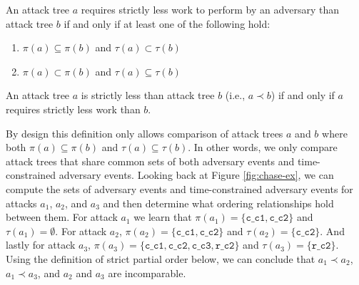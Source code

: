 \documentclass[runningheads]{llncs}
\theoremstyle{definition}
\newcommand{\squash}{\itemsep=0pt\parskip=0pt}
\begin{document}
\begin{definition}
  An attack tree $a$ requires strictly less work to perform by an
  adversary than attack tree $b$ if and only if at least one of the
  following hold:  
\begin{enumerate}
  \squash
  \item $\pi(a) \subseteq \pi(b)$ and $\tau(a) \subset \tau(b)$
  \item $\pi(a) \subset \pi(b)$ and $\tau(a) \subseteq \tau(b)$
\end{enumerate}
\end{definition}

\begin{definition}
  An attack tree $a$ is strictly less than attack tree $b$ (i.e., $a
  \prec b$) if and only if $a$ requires strictly less work than $b$. 
\end{definition}

\noindent By design this definition only allows comparison of
attack trees $a$ and $b$ where both $\pi(a) \subseteq \pi(b)$ and
$\tau(a) \subseteq \tau(b)$. In other words, we only compare attack
trees that share common sets of both adversary events and
time-constrained adversary events. Looking back at Figure
\ref{fig:chase-ex}, we can compute the sets of adversary events and
time-constrained adversary events for attacks $a_1$, $a_2$,
and $a_3$ and then determine what ordering relationships hold between
them. For attack $a_1$ we learn that $\pi(a_1) = \{ \texttt{c\_c1},
\texttt{c\_c2} \}$ and $\tau(a_1) = \emptyset$. For attack $a_2$,
$\pi(a_2) = \{ \texttt{c\_c1}, \texttt{c\_c2} \}$ and $\tau(a_2) = \{
\texttt{c\_c2} \}$. And lastly for attack $a_3$, $\pi(a_3) = \{
\texttt{c\_c1}, \texttt{c\_c2}, \texttt{c\_c3}, \texttt{r\_c2} \}$ and
$\tau(a_3) = \{ \texttt{r\_c2} \}$. Using the definition of strict
partial order below, we can conclude that $a_1 \prec a_2$, $a_1 \prec
a_3$, and $a_2$ and $a_3$ are incomparable. 
\end{document}
